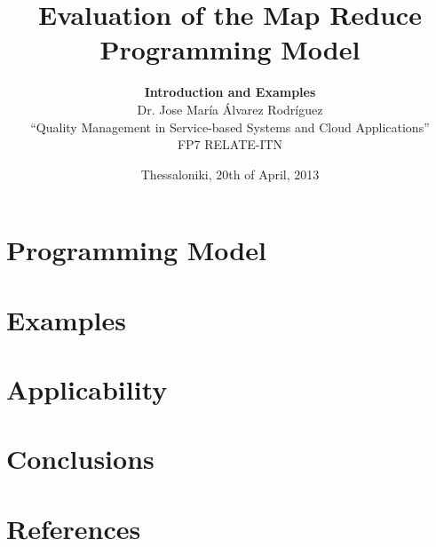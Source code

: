 \documentclass[xcolor=dvipsnames,dvip,notes=show,table]{beamer}
\title[MapReduce Intro]{Evaluation of the Map Reduce Programming Model}
\author[Dr. Jose María Álvarez Rodríguez]{\textbf{Introduction and Examples}\\ \vspace{0.3cm} Dr. Jose María Álvarez Rodríguez \\ \vspace{0.3cm} ``Quality Management in Service-based Systems and Cloud Applications'' \\ \vspace{0.3cm} FP7 RELATE-ITN}
\subtitle{}
\institute{South East European Research Center}
\date{Thessaloniki, 20th of April, 2013}
\begin{document}
\frame{
\titlepage

}

\frame{
\tableofcontents

}


\section{Programming Model}

\section{Examples}

\section{Applicability}

\section{Conclusions}

\frame{
\titlepage

}


\appendix
\section*{References}
%
% 
% 
% 
\end{document}
